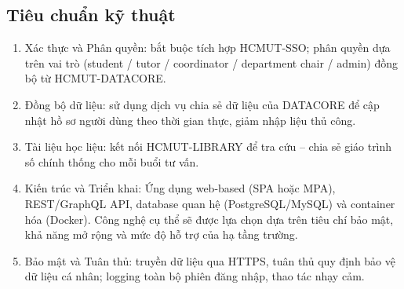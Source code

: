 \documentclass[12pt, a4paper, oneside]{report}
\begin{document}
\begin{spacing}{1.5}
\section{Tiêu chuẩn kỹ thuật}
\begin{enumerate}
    \item Xác thực và Phân quyền: bắt buộc tích hợp HCMUT-SSO; phân quyền dựa trên vai trò (student / tutor / coordinator / department chair / admin) đồng bộ từ HCMUT-DATACORE.
    \item Đồng bộ dữ liệu: sử dụng dịch vụ chia sẻ dữ liệu của DATACORE để cập nhật hồ sơ người dùng theo thời gian thực, giảm nhập liệu thủ công.
    \item Tài liệu học liệu: kết nối HCMUT-LIBRARY để tra cứu – chia sẻ giáo trình số chính thống cho mỗi buổi tư vấn.
    \item Kiến trúc và Triển khai: Ứng dụng web-based (SPA hoặc MPA), REST/GraphQL API, database quan hệ (PostgreSQL/MySQL) và container hóa (Docker). Công nghệ cụ thể sẽ được lựa chọn dựa trên tiêu chí bảo mật, khả năng mở rộng và mức độ hỗ trợ của hạ tầng trường.
    \item Bảo mật và Tuân thủ: truyền dữ liệu qua HTTPS, tuân thủ quy định bảo vệ dữ liệu cá nhân; logging toàn bộ phiên đăng nhập, thao tác nhạy cảm.
\end{enumerate}

\end{spacing}
\end{document}
